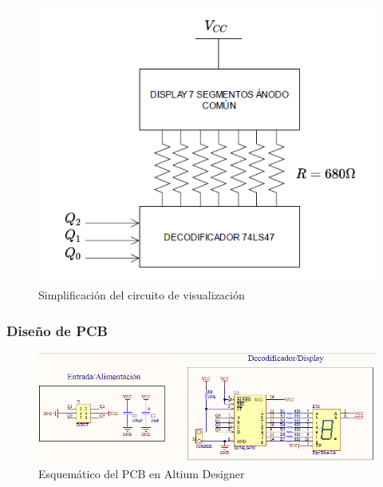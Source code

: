 \begin{figure}[H]
    \centering
        \includegraphics[scale=0.6]{../EJ7/Recursos/visualizacion_simple.png}
    \caption{Simplificaci\'on del circuito de visualizaci\'on}
    \label{fig:visualizacion_simple_circuito}
\end{figure}

\subsubsection{Dise\~no de PCB}

\begin{figure}[H]
    \centering
        \includegraphics[scale=0.7]{../EJ7/Recursos/esquematico_visualizacion.PNG}
    \caption{Esquem\'atico del PCB en Altium Designer}
    \label{fig:esquematico_visualizacion}
\end{figure}

